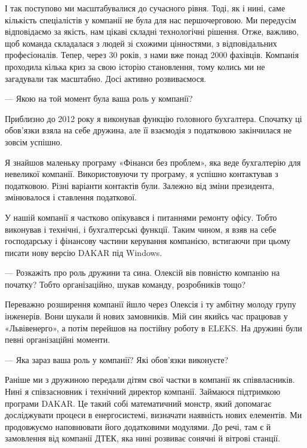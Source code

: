 І так поступово ми масштабувалися до сучасного рівня. Тоді, як і нині, саме
кількість спеціалістів у компанії не була для нас першочерговою. Ми передусім
відповідаємо за якість, нам цікаві складні технологічні рішення. Отже, важливо,
щоб команда складалася з людей зі схожими цінностями, з відповідальних
професіоналів. Тепер, через 30 років, з нами вже понад 2000 фахівців. Компанія
проходила кілька криз за свою історію становлення, тому колись ми не загадували
так масштабно. Досі активно розвиваємося.


— Якою на той момент була ваша роль у компанії?

Приблизно до 2012 року я виконував функцію головного бухгалтера. Спочатку ці
обов’язки взяла на себе дружина, але її взаємодія з податковою закінчилася не
зовсім успішно.

Я знайшов маленьку програму «Фінанси без проблем», яка веде бухгалтерію для
невеликої компанії. Використовуючи ту програму, я успішно контактував з
податковою. Різні варіанти контактів були. Залежно від зміни президента,
змінювалося і ставлення податкової.

У нашій компанії я частково опікувався і питаннями ремонту офісу. Тобто
виконував і технічні, і бухгалтерські функції. Таким чином, я взяв на себе
господарську і фінансову частини керування компанією, встигаючи при цьому
писати нову версію DAKAR під Windows.

— Розкажіть про роль дружини та сина. Олексій вів повністю компанію на початку?
Тобто організаційно, шукав команду, розробників тощо?

Переважно розширення компанії йшло через Олексія і ту амбітну молоду групу
інженерів. Вони шукали й нових замовників. Мій син якийсь час працював у
«Львівенерго», а потім перейшов на постійну роботу в ELEKS. На дружині були
певні організаційні моменти.  

— Яка зараз ваша роль у компанії? Які обов’язки виконуєте?

Раніше ми з дружиною передали дітям свої частки в компанії як співвласників.
Нині я співзасновник і технічний директор компанії. Займаюся підтримкою
програми DAKAR. Це такий собі математичний монстр, який допомагає досліджувати
процеси в енергосистемі, визначати наявність нових елементів. Ми продовжуємо
наповнювати його додатковими модулями. До речі, там є й замовлення від компанії
ДТЕК, яка нині розвиває сонячні й вітрові станції.

